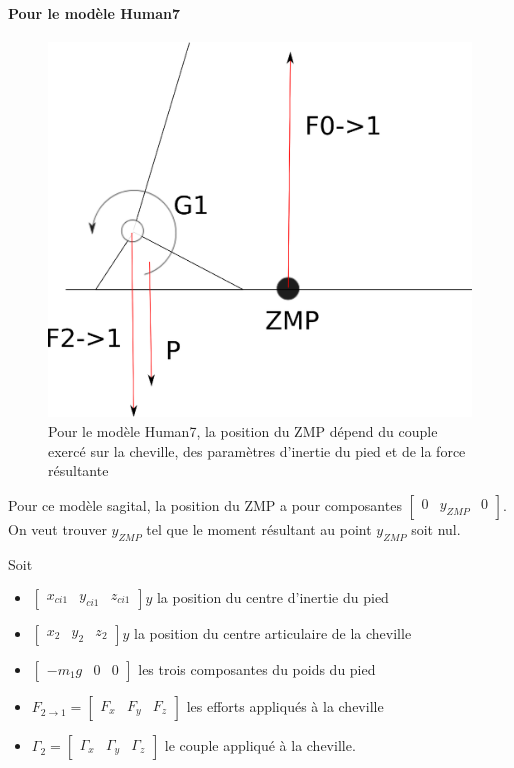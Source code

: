 \documentclass[a4paper, 10pt ]{article}
\begin{document}
\paragraph{Pour le modèle Human7}
\begin{figure}[h]
\centering
\includegraphics[width=0.5\columnwidth]{images/model/ZMPpied.eps}
\caption{Pour le modèle Human7, la position du ZMP dépend du couple exercé sur la cheville, des paramètres d'inertie du pied et de la force résultante}
\label{fig:ZMPpied}
\end{figure}

Pour ce modèle sagital, la position du ZMP a pour composantes $\begin{bmatrix} 0 &y_{ZMP}& 0\end{bmatrix}$.
On veut trouver $y_{ZMP}$ tel que le moment résultant au point $y_{ZMP}$ soit nul.

Soit 
\begin{itemize}
\item $\begin{bmatrix} x_{ci1} &y_{ci1}& z_{ci1}\end{bmatrix}y$ la position du centre d'inertie du pied 
\item $\begin{bmatrix} x_{2} &y_{2}& z_{2}\end{bmatrix}y$ la position du centre articulaire de la cheville
\item $\begin{bmatrix} -m_1g &0& 0\end{bmatrix}$ les trois composantes du poids du pied
\item $F_{2\rightarrow1}=\begin{bmatrix} F_x &F_y& F_z\end{bmatrix}$ les efforts appliqués à la cheville
\item $\Gamma_2=\begin{bmatrix} \Gamma_x &\Gamma_y& \Gamma_z\end{bmatrix}$ le couple appliqué à la cheville.
\end{itemize}
\end{document}
